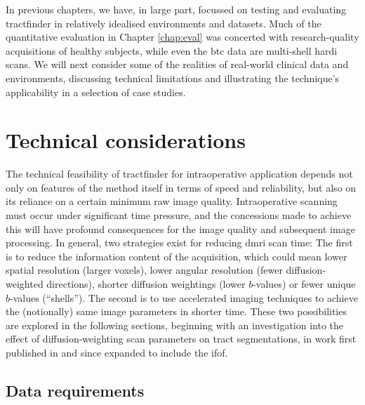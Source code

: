 \documentclass[12pt,phd,a4paper,twoside]{ucl_thesis}
\renewcommand{\textcite}[2][]{
\ifthenelse { \equal {#1} {} }  {\citeauthor{#2}\autocite{#2}}   {\citeauthor{#1}\autocite{#2}}}
\begin{document}
In previous chapters, we have, in large part, focussed on testing and evaluating tractfinder in relatively idealised environments and datasets.
Much of the quantitative evaluation in Chapter \ref{chap:eval} was concerted with research-quality acquisitions of healthy subjects, while even the \gls{btc} data are multi-shell \gls{hardi} scans.
We will next consider some of the realities of real-world clinical data and environments, discussing technical limitations and illustrating the technique's applicability in a selection of case studies.

\section{Technical considerations}\label{sec:technical}

The technical feasibility of tractfinder for intraoperative application depends not only on features of the method itself in terms of speed and reliability, but also on its reliance on a certain minimum raw image quality.
Intraoperative scanning must occur under significant time pressure, and the concessions made to achieve this will have profound consequences for the image quality and subsequent image processing.
In general, two strategies exist for reducing \gls{dmri} scan time:
The first is to reduce the information content of the acquisition, which could mean lower spatial resolution (larger voxels), lower angular resolution (fewer diffusion-weighted directions), shorter diffusion weightings (lower $b$-values) or fewer unique $b$-values (``shells'').
The second is to use accelerated imaging techniques to achieve the (notionally) same image parameters in shorter time.
These two possibilities are explored in the following sections, beginning with an investigation into the effect of diffusion-weighting scan parameters on tract segmentations, in work first published in \textcite{Young2022a} and since expanded to include the \gls{ifof}.

\subsection{Data requirements}\label{sec:ismrmdiff}
\end{document}
